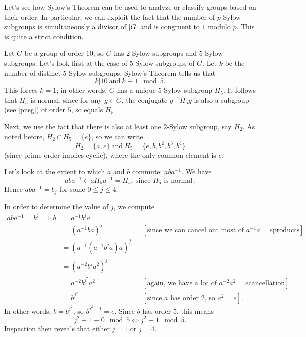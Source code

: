 \documentclass[math1530-lecture-notes]{subfiles}
\begin{document}
Let's see how Sylow's Theorem can be used to analyze or classify groups based on their order. In
particular, we can exploit the fact that the number of $p$-Sylow subgroups is simultaneously a
divisor of $\left| G \right| $ and is congruent to $1$ modulo $p$. This is quite a strict condition.
\begin{example}
  Let $G$ be a group of order $10$, so $G$ has $2$-Sylow subgroups and $5$-Sylow subgroups. Let's
  look first at the case of $5$-Sylow subgroups of $G$. Let $k$ be the number of distinct $5$-Sylow
  subgroups. Sylow's Theorem tells us that \[
    k | 10 ~\text{and}~k\equiv 1\mod{5}
  .\] This forces $k=1$; in other words, $G$ has a unique $5$-Sylow subgroup $H_5$. It follows that
  $H_5$ is normal, since for any $g\in G$, the conjugate $g^{-1}H_5g$ is also a subgroup (see
  \ref{pnsg}) of order $5$, so equals $H_5$.

  Next, we use the fact that there is also at least one $2$-Sylow subgroup, say $H_2$. As noted
  before, $H_2\cap H_5=\{ e \}$, so we can write \[
    H_2=\{ a,e \}~\text{and}~H_5=\{ e,b,b^2,b^3,b^4 \}
  \] (since prime order implies cyclic), where the only common element is $e$.

  Let's look at the extent to which $a$ and $b$ commute: $aba^{-1}$. We have \[
    aba^{-1}\in aH_5a^{-1}=H_5,~\text{since $H_5$ is normal}~
  .\] Hence $aba^{-1}=b_j$ for some $0\le j\le 4$.

  In order to determine the value of $j$, we compute
  \begin{align*}
    aba^{-1}=b^j \implies b&= a^{-1}b^ja \\
                           &=(a^{-1}ba)^j && [\text{since we can cancel out most of $a^{-1}a=e$
                           products}]\\
                           &= \left( a^{-1}(a^{-1}b^ja)a \right) ^j\\
                           &= (a^{-2}b^ja^2)^j\\
                           &= a^{-2}b^{j^2}a^2 &&[\text{again, we have a lot of $a^{-2}a^2=e$
                           cancellation}]\\
                           &=b^{j^2} &&[\text{since $a$ has order $2$, so $a^2=e$}]
  .\end{align*}
  In other words, $b=b^{j^2}$, so $b^{j^2-1}=e$. Since $b$ has order $5$, this means \[
    j^2-1\equiv 0\mod{5}\iff j^2\equiv 1\mod{5}
  .\] Inspection then reveals that either $j=1$ or $j=4$.


\end{example}
\end{document}
